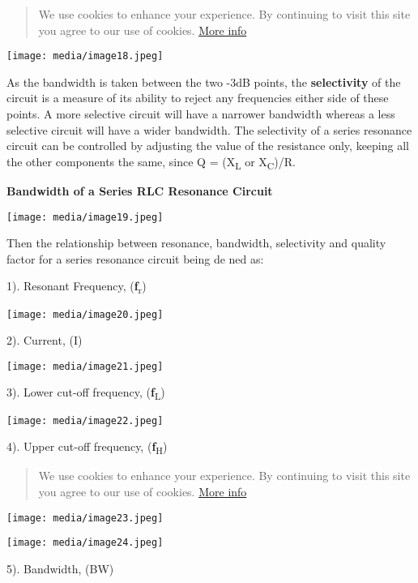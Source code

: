 \documentclass[]{article}
\begin{document}
\begin{quote}
We use cookies to enhance your experience. By continuing to visit this
site you agree to our use of cookies.
\href{http://wikipedia.org/wiki/HTTP_cookie}{More info}
\end{quote}

\texttt{[image: media/image18.jpeg]}

As the bandwidth is taken between the two -3dB points, the
\textbf{selectivity} of the circuit is a measure of its ability to
reject any frequencies either side of these points. A more selective
circuit will have a narrower bandwidth whereas a less selective circuit
will have a wider bandwidth. The selectivity of a series resonance
circuit can be controlled by adjusting the value of the resistance only,
keeping all the other components the same, since Q = (X\textsubscript{L}
or X\textsubscript{C})/R.

\textbf{Bandwidth of a Series RLC Resonance Circuit}

\texttt{[image: media/image19.jpeg]}

Then the relationship between resonance, bandwidth, selectivity and
quality factor for a series resonance circuit being de ned as:

1). Resonant Frequency, (\textbf{ƒ}\textsubscript{r})

\texttt{[image: media/image20.jpeg]}

2). Current, (I)

\texttt{[image: media/image21.jpeg]}

3). Lower cut-off frequency, (\textbf{ƒ}\textsubscript{L})

\texttt{[image: media/image22.jpeg]}

4). Upper cut-off frequency, (\textbf{ƒ}\textsubscript{H})

\begin{quote}
We use cookies to enhance your experience. By continuing to visit this
site you agree to our use of cookies.
\href{http://wikipedia.org/wiki/HTTP_cookie}{More info}
\end{quote}

\texttt{[image: media/image23.jpeg]}

\texttt{[image: media/image24.jpeg]}

5). Bandwidth, (BW)
\end{document}
